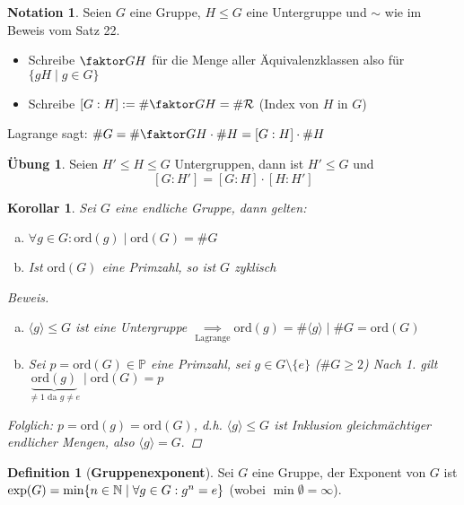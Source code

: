 \documentclass[a4paper]{article}
\theoremstyle{plain}
\newtheorem{kor}[thm]{Korollar}
\theoremstyle{definition}
\newtheorem{defi}[thm]{Definition}
\newtheorem*{nota*}{Notation}
\newtheorem{ubng}[thm]{Übung}
\begin{document}
\begin{nota*}
Seien $G$ eine Gruppe, $H \le G$ eine Untergruppe und $\sim$ wie im Beweis vom Satz 22.
\begin{itemize}
\item Schreibe $\faktor GH$ für die Menge aller Äquivalenzklassen also für $\{gH \mid g \in G\}$
\item Schreibe $[G : H]:= \#  \faktor GH = \# \mathcal R$ (Index von $H$ in $G$)
\end{itemize}
Lagrange sagt: $\#G = \# \faktor GH \cdot \#H = [G : H] \cdot \#H$
\end{nota*}

\begin{ubng}
Seien $H' \le H \le G$ Untergruppen, dann ist $H' \le G$ und
$$[G: H'] = [G:H]\cdot[H:H']$$
\end{ubng}

\begin{kor} %
  Sei $G$ eine endliche Gruppe, dann gelten:
  \begin{enumerate}[(a)]
    \item $\forall g \in G : \mathrm{ord}(g) \mid \mathrm{ord}(G) = \#G$
    \item Ist $\mathrm{ord}(G)$ eine Primzahl, so ist $G$ zyklisch
  \end{enumerate}
  \begin{proof}[Beweis] \item
    \begin{enumerate}[(a)]
\item $\langle g \rangle \le G$ ist eine Untergruppe $\underset{\text{Lagrange}}\implies \mathrm{ord}(g) = \#\langle g \rangle \mid \#G = \mathrm{ord}(G)$
\item Sei $p = \mathrm{ord}(G) \in \mathbb P$ eine Primzahl, sei $g \in G \setminus \{e\}$ ($\#G \ge 2$)
Nach 1. gilt $\underbrace{\mathrm{ord}(g)}_{\neq 1 \text{ da } g \neq e} \mid \mathrm{ord}(G) = p$
    \end{enumerate}
Folglich: $p = \mathrm{ord}(g) = \mathrm{ord}(G)$, d.h. $\langle g \rangle \le G$ ist Inklusion gleichmächtiger endlicher Mengen, also $\langle g \rangle = G.$
\end{proof}
\end{kor}

\begin{defi}[\textbf{Gruppenexponent}]
Sei $G$ eine Gruppe, der Exponent von $G$ ist $\exp(G) = \min \{n \in \Bbb N \mid \forall g \in G : g^{n} = e\}$ (wobei $\min \emptyset = \infty$).
\end{defi}
\end{document}

